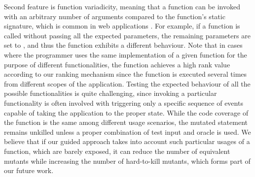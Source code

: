 Second feature is function variadicity, meaning that a \javascript function can be invoked with an arbitrary number of arguments compared to the function's static signature, which is common in web applications \cite{richards:pldi10}.
For example, if a function is called without passing all the expected parameters, the remaining parameters are set to , and thus the function exhibits a different behaviour. Note that in cases where the programmer uses the same implementation of a given function for the purpose of different functionalities, the function achieves a high rank value according to our ranking mechanism since the function is executed several times from different scopes of the application. Testing the expected behaviour of all the possible functionalities is quite challenging, since invoking a particular functionality is often involved with triggering only a specific sequence of events capable of taking the application to the proper state. While the code coverage  of the function is the same among different usage scenarios, the mutated statement remains unkilled unless a proper combination of test input and oracle is used. We believe that if our guided approach takes into account such particular usages of a function,  which are barely exposed, it can reduce the number of equivalent mutants while increasing the number of hard-to-kill mutants, which forms part of our future work.
